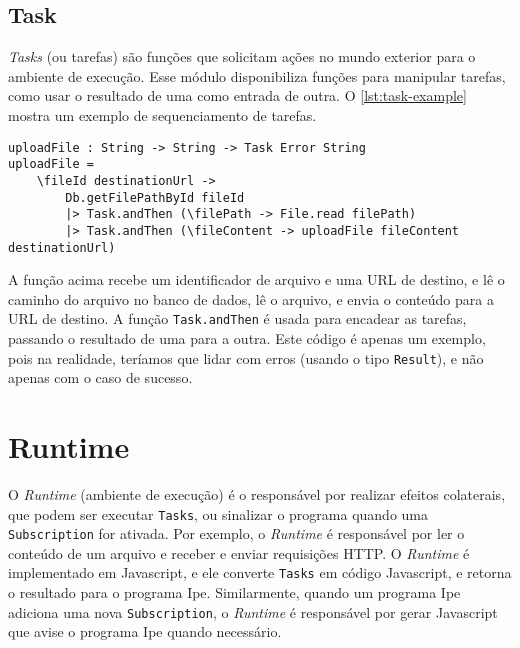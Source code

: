 \subsection{Task}

\textit{Tasks} (ou tarefas) são funções que solicitam ações no mundo exterior para
o ambiente de execução. Esse módulo disponibiliza funções para manipular tarefas,
como usar o resultado de uma como entrada de outra. O \autoref{lst:task-example}
mostra um exemplo de sequenciamento de tarefas.

\begin{lstlisting}[label={lst:task-example},caption={Exemplo de sequenciamento de tarefas}]
uploadFile : String -> String -> Task Error String
uploadFile =
    \fileId destinationUrl ->
        Db.getFilePathById fileId
        |> Task.andThen (\filePath -> File.read filePath)
        |> Task.andThen (\fileContent -> uploadFile fileContent destinationUrl)
\end{lstlisting}

A função acima recebe um identificador de arquivo e uma URL de destino, e lê
o caminho do arquivo no banco de dados, lê o arquivo, e envia o conteúdo para
a URL de destino. A função \texttt{Task.andThen} é usada para encadear as tarefas,
passando o resultado de uma para a outra. Este código é apenas um exemplo, pois
na realidade, teríamos que lidar com erros (usando o tipo \texttt{Result}), e
não apenas com o caso de sucesso.


\section{Runtime}\label{sec:runtime}

O \textit{Runtime} (ambiente de execução) é o responsável por realizar efeitos
colaterais, que podem ser executar \texttt{Tasks}, ou sinalizar o programa quando
uma \texttt{Subscription} for ativada. Por exemplo, o \textit{Runtime} é responsável
por ler o conteúdo de um arquivo e receber e enviar requisições HTTP. O \textit{Runtime}
é implementado em Javascript, e ele converte \texttt{Tasks} em código Javascript,
e retorna o resultado para o programa Ipe. Similarmente, quando um programa Ipe
adiciona uma nova \texttt{Subscription}, o \textit{Runtime} é responsável por
gerar Javascript que avise o programa Ipe quando necessário.


